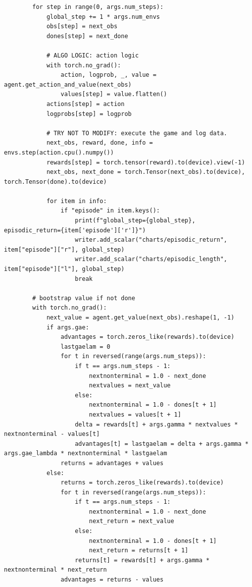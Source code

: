 \documentclass[11pt,a4paper]{article}
\begin{document}
\begin{lstlisting}
        for step in range(0, args.num_steps):
            global_step += 1 * args.num_envs
            obs[step] = next_obs
            dones[step] = next_done

            # ALGO LOGIC: action logic
            with torch.no_grad():
                action, logprob, _, value = agent.get_action_and_value(next_obs)
                values[step] = value.flatten()
            actions[step] = action
            logprobs[step] = logprob

            # TRY NOT TO MODIFY: execute the game and log data.
            next_obs, reward, done, info = envs.step(action.cpu().numpy())
            rewards[step] = torch.tensor(reward).to(device).view(-1)
            next_obs, next_done = torch.Tensor(next_obs).to(device), torch.Tensor(done).to(device)

            for item in info:
                if "episode" in item.keys():
                    print(f"global_step={global_step}, episodic_return={item['episode']['r']}")
                    writer.add_scalar("charts/episodic_return", item["episode"]["r"], global_step)
                    writer.add_scalar("charts/episodic_length", item["episode"]["l"], global_step)
                    break

        # bootstrap value if not done
        with torch.no_grad():
            next_value = agent.get_value(next_obs).reshape(1, -1)
            if args.gae:
                advantages = torch.zeros_like(rewards).to(device)
                lastgaelam = 0
                for t in reversed(range(args.num_steps)):
                    if t == args.num_steps - 1:
                        nextnonterminal = 1.0 - next_done
                        nextvalues = next_value
                    else:
                        nextnonterminal = 1.0 - dones[t + 1]
                        nextvalues = values[t + 1]
                    delta = rewards[t] + args.gamma * nextvalues * nextnonterminal - values[t]
                    advantages[t] = lastgaelam = delta + args.gamma * args.gae_lambda * nextnonterminal * lastgaelam
                returns = advantages + values
            else:
                returns = torch.zeros_like(rewards).to(device)
                for t in reversed(range(args.num_steps)):
                    if t == args.num_steps - 1:
                        nextnonterminal = 1.0 - next_done
                        next_return = next_value
                    else:
                        nextnonterminal = 1.0 - dones[t + 1]
                        next_return = returns[t + 1]
                    returns[t] = rewards[t] + args.gamma * nextnonterminal * next_return
                advantages = returns - values


\end{lstlisting}
\end{document}
